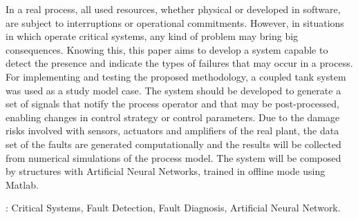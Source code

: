 In a real process, all used resources, whether physical or developed in
software, are subject to interruptions or operational commitments. However, in
situations in which operate critical systems, any kind of problem may bring big
consequences. Knowing this, this paper aims to develop a system capable to
detect the presence and indicate the types of failures that may occur in a
process. For implementing and testing the proposed methodology, a
coupled tank system was used as a study model case. The system should be
developed to generate a set of signals that notify the process operator and that
may be post-processed, enabling changes in control strategy or control
parameters. Due to the damage risks involved with sensors, actuators and
amplifiers of the real plant, the data set of the faults are generated
computationally and the results will be collected from numerical simulations of
the process model. The system will be composed by structures with Artificial
Neural Networks, trained in offline mode using Matlab\reg.

\vspace{1.5ex}

: Critical Systems, Fault Detection, Fault Diagnosis,
Artificial Neural Network.
